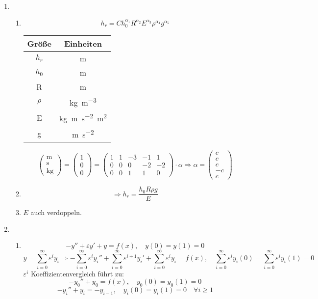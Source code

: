 \documentclass[a4paper,11pt]{scrartcl}
\newcommand*{\eps}{\varepsilon}
\newcommand*{\sm}{\sum_{i=0}^\infty}
\begin{document}
\begin{enumerate}[label*=\textbf{7.\arabic*.}]
\begin{enumerate}
  \end{enumerate}
  
  \item
  \begin{enumerate}
    \item
    \[ h_r = C h_0^{\alpha_1}
      R^{\alpha_2}E^{\alpha_3}\rho^{\alpha_4}g^{\alpha_5} \]

      \begin{tabular}{c|c}
        Größe & Einheiten \\
        \hline
        $h_r$ & \si{\m} \\
        $h_0$ & \si{\m} \\
        R & \si{m} \\
        $\rho$ & \si{\kg\per\m^3}\\
        E & \si{\kg\m\per\s^2\m^2}\\
        g & \si{\m\per\s^2} \\
      \end{tabular}

    \[\begin{pmatrix}\si{\m}\\\si{\s}\\\si{\kg}\end{pmatrix}
      = \begin{pmatrix}1\\0\\0\end{pmatrix}
      = \begin{pmatrix}1&1&-3&-1&1\\0&0&0&-2&-2\\0&0&1&1&0\end{pmatrix} \cdot \alpha
      \Rightarrow
      \alpha = \begin{pmatrix}c\\c\\c\\-c\\c\end{pmatrix}
    \]

    \item
    \[\Rightarrow h_r = \frac{h_0 R \rho g}{E}\]

    \item
      $E$ auch verdoppeln.

  \end{enumerate}

  \item
  \begin{enumerate}
    \item
      \[-y'' + \eps y' + y = f(x), \quad y(0)=y(1)=0\]
      \[ y = \sm \eps^i y_i \Rightarrow -\sm \eps^i y_i'' + \sm \eps^{i+1} y_i' +
        \sm \eps^i y_i = f(x), \quad \sm \eps^i y_i(0) = \sm \eps^i y_i(1) = 0\]
      $\eps^i$ Koeffizientenvergleich führt zu:
      \[ - y_0'' + y_0 = f(x), \quad y_0(0) = y_0(1) = 0\]
      \[ - y_i'' + y_i = -y_{i-1}, \quad y_i(0) = y_i(1) = 0 \quad \forall i
        \geq 1\]


\end{enumerate}
\end{enumerate}
\end{document}
